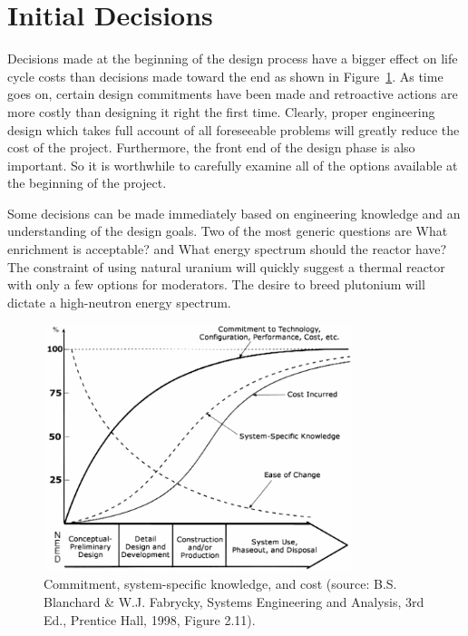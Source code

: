 \section{Initial Decisions}
Decisions made at the beginning of the design process have a bigger effect on life cycle costs than decisions made toward the end as shown in Figure~\ref{fig:life_cycle_cost}. 
As time goes on, certain design commitments have been made and retroactive actions are more costly than designing it right the first time.
Clearly, proper engineering design which takes full account of all foreseeable problems will greatly reduce the cost of the project.
Furthermore, the front end of the design phase is also important. So it is worthwhile to carefully examine all of the options available at the beginning of the project. 

Some decisions can be made immediately based on engineering knowledge and an understanding of the design goals. Two of the most generic questions are What enrichment is acceptable? and What energy spectrum should the reactor have? The constraint of using natural uranium will quickly suggest a thermal reactor with only a few options for moderators. The desire to breed plutonium will dictate a high-neutron energy spectrum. 

\begin{figure}[!hbp]
  \label{fig:life_cycle_cost}
  \centering
  \includegraphics[width=0.80\textwidth]{graphics/life_cycle_cost_chart.png}
  \caption{Commitment, system-specific knowledge, and cost (source: B.S. Blanchard \& W.J. Fabrycky, Systems Engineering and Analysis, 3rd Ed., Prentice Hall, 1998, Figure 2.11).}
\end{figure}

